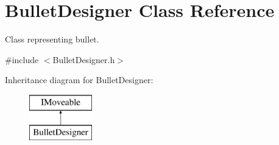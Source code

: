 \hypertarget{class_bullet_designer}{}\section{Bullet\+Designer Class Reference}
\label{class_bullet_designer}


Class representing bullet.  




{\ttfamily \#include $<$Bullet\+Designer.\+h$>$}

Inheritance diagram for Bullet\+Designer\+:\begin{figure}[H]
\begin{center}
\leavevmode
\includegraphics[height=2.000000cm]{class_bullet_designer}
\end{center}
\end{figure}
